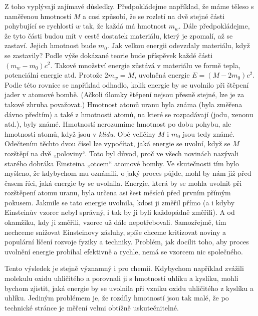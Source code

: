     Z toho vyplývají zajímavé důsledky. Předpokládejme například, že máme těleso s naměřenou 
    hmotností \(M\) a cosi způsobí, že se rozletí na dvě stejné části pohybující se rychlostí \(w\) 
    tak, že každá má hmotnost \(m_w\). Dále předpokládejme, že tyto části budou mít v cestě 
    dostatek materiálu, který je zpomalí, až se zastaví. Jejich hmotnost bude \(m_0\). Jak velkou 
    energii odevzdaly materiálu, když se zastavily? Podle výše dokázané teorie bude příspěvek každé 
    části \((m_w - m_0)c^2\). Takové množství energie zůstává v materiálu ve formě tepla, 
    potenciální energie atd. Protože \(2m_w = M\), uvolněná energie \(E = (M - 2m_0)c^2\). Podle 
    této rovnice se například odhadlo, kolik energie by se uvolnilo při štěpení jader v atomové 
    bombě. (Ačkoli úlomky štěpení nejsou přesně stejné, lze je za takové zhruba považovat.) 
    Hmotnost atomů uranu byla známa (byla změřena dávno předtím) a také z hmotnosti atomů, na které 
    se rozpadávají (jodu, xenonu atd.), byly známé. Hmotností nerozumíme hmotnost po dobu pohybu, 
    ale hmotnosti atomů, když jsou v \emph{klidu}. Obě veličiny \(M\) i \(m_0\) jsou tedy známé. 
    Odečtením těchto dvou čísel lze vypočítat, jaká energie se uvolní, když se \(M\) rozštěpí na 
    dvě „poloviny“. Toto byl důvod, proč ve všech novinách nazývali starého dobráka Einsteina 
    „otcem“ atomové bomby. Ve skutečnosti tím bylo myšleno, že kdybychom mu oznámili, o jaký proces 
    půjde, mohl by nám již před časem říci, jaká energie by se uvolnila. Energie, která by se mohla 
    uvolnit při rozštěpení atomu uranu, byla určena asi šest měsíců před prvním přímým pokusem. 
    Jakmile se tato energie uvolnila, kdosi ji změřil přímo (a i kdyby Einsteinův vzorec nebyl 
    správný, i tak by ji byli každopádně změřili). A od okamžiku, kdy ji změřili, vzorec už dále 
    nepotřebovali. Samozřejmě, tím nechceme snižovat Einsteinovy zásluhy, spíše chceme kritizovat 
    noviny a populární líčení rozvoje fyziky a techniky. Problém, jak docílit toho, aby proces 
    uvolnění energie probíhal efektivně a rychle, nemá se vzorcem nic společného.
    
    Tento výsledek je stejně významný i pro chemii. Kdybychom například zvážili molekulu oxidu 
    uhličitého a porovnali ji s hmotností uhlíku a kyslíku, mohli bychom zjistit, jaká energie by 
    se uvolnila při vzniku oxidu uhličitého z kyslíku a uhlíku. Jediným problémem je, že rozdíly 
    hmotností jsou tak malé, že po technické stránce je měření velmi obtížně uskutečnitelné.
    
